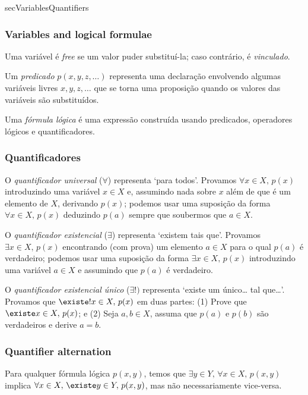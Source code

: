 \begin{tldr}{secVariablesQuantifiers}

\subsubsection*{Variables and logical formulae}

\begin{tldrlist}
Uma variável é \textit{free} se um valor puder substituí-la; caso contrário, é \textit{vinculado}.

Um \textit{predicado} $p(x,y,z,\dots)$ representa uma declaração envolvendo algumas variáveis ​​livres $x,y,z,\dots{}$ que se torna uma proposição quando os valores das variáveis ​​são substituídos.

Uma \textit{fórmula lógica} é uma expressão construída usando predicados, operadores lógicos e quantificadores.
\end{tldrlist}

\subsubsection*{Quantificadores}

\begin{tldrlist}
O \textit{quantificador universal} ($\forall$) representa `para todos'. Provamos $\forall x \in X,\, p(x)$ introduzindo uma variável $x \in X$ e, assumindo nada sobre $x$ além de que é um elemento de $X$, derivando $p (x)$; podemos usar uma suposição da forma $\forall x \in X,\, p(x)$ deduzindo $p(a)$ sempre que soubermos que $a \in X$.

O \textit{quantificador existencial} ($\exists$) representa `existem\pontos{} tais que\pontos{}'. Provamos $\exists x \in X,\, p(x)$ encontrando (com prova) um elemento $a \in X$ para o qual $p(a)$ é verdadeiro; podemos usar uma suposição da forma $\exists x \in X,\, p(x)$ introduzindo uma variável $a \in X$ e assumindo que $p(a)$ é verdadeiro.

O \textit{quantificador existencial único} ($\exists !)$ representa `existe um único\dots{} tal que\dots{}'. Provamos que $\existe! x \in X,\, p(x)$ em duas partes: (1) Prove que $\existe x \in X,\, p(x)$; e (2) Seja $a,b \in X$, assuma que $p(a)$ e $p(b)$ são verdadeiros e derive $a=b$.
\end{tldrlist}

\subsubsection*{Quantifier alternation}

\begin{tldrlist}
Para qualquer fórmula lógica $p(x,y)$, temos que $\exists y \in Y,\, \forall x \in X,\, p(x,y)$ implica $\forall x \in X ,\, \existe y \in Y,\, p(x,y)$, mas não necessariamente vice-versa.
\end{tldrlist}

\end{tldr}

